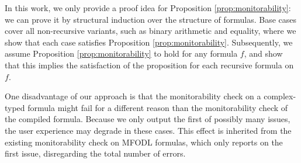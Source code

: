In this work, we only provide a proof idea for Proposition \ref{prop:monitorability}: we can prove it by structural induction over the structure of formulas. Base cases cover all non-recursive variants, such as binary arithmetic and equality, where we show that each case satisfies Proposition \ref{prop:monitorability}. Subsequently, we assume Proposition \ref{prop:monitorability} to hold for any formula $f$, and show that this implies the satisfaction of the proposition for each recursive formula on $f$.

One disadvantage of our approach is that the monitorability check on a complex-typed formula might fail for a different reason than the monitorability check of the compiled formula. Because we only output the first of possibly many issues, the user experience may degrade in these cases. This effect is inherited from the existing monitorability check on MFODL formulas, which only reports on the first issue, disregarding the total number of errors.

